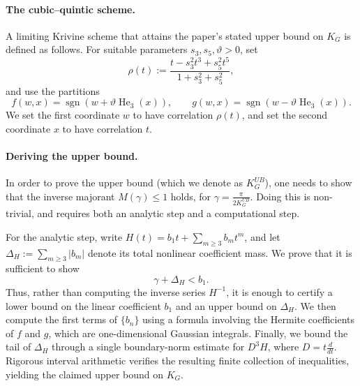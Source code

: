% 

\paragraph{The cubic--quintic scheme.}
A limiting Krivine scheme that attains the paper's stated upper bound on \(K_G\) is defined as follows.
For suitable parameters \(s_3,s_5,\vartheta>0\), set
\[
    \rho(t):=
    \frac{t-s_3^2t^3+s_5^2t^5}{1+s_3^2+s_5^2},
\]
and use the partitions
\[
    f(w,x)=\operatorname{sgn}\!\left(w+\vartheta\operatorname{He}_3(x)\right),
    \qquad
    g(w,x)=\operatorname{sgn}\!\left(w-\vartheta\operatorname{He}_3(x)\right).
\]
We set the first coordinate \(w\) to have correlation \(\rho(t)\), and set the second coordinate \(x\) to have correlation \(t\).




\paragraph{Deriving the upper bound.}
In order to prove the upper bound (which we denote as $K_G^{UB}$), one needs to show that the inverse majorant $M(\gamma) \leq 1$ holds, for $\gamma=\frac{\pi}{2K_G^{UB}}$.
Doing this is non-trivial, and requires both an analytic step and a computational step. 

For the analytic step, write
\(H(t)=b_1t+\sum_{m\geq 3}b_mt^m\), and let
\(\Delta_H:=\sum_{m\geq 3}|b_m|\) denote its total nonlinear coefficient mass. We prove that it is sufficient to show 
\[
    \gamma+\Delta_H<b_1.
\]
Thus, rather than computing the inverse series \(H^{-1}\), it is enough to certify a lower bound on the linear coefficient \(b_1\) and an upper bound on \(\Delta_H\).
We then compute the first terms of $\{b_n\}$ using a formula involving the Hermite coefficients of $f$ and $g$, which are one-dimensional Gaussian integrals. Finally, we bound the tail of $\Delta_H$ through a single boundary-norm estimate for \(D^3H\), where \(D=t\frac{d}{dt}\). Rigorous interval arithmetic verifies the resulting finite collection of inequalities, yielding the claimed upper bound on \(K_G\).



